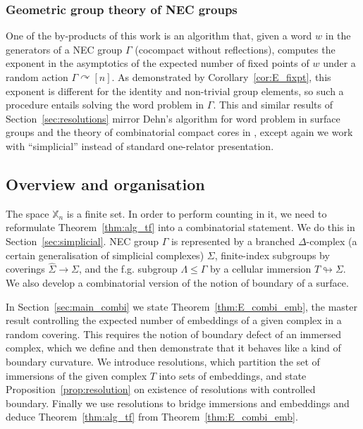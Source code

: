 \documentclass{amsart}
\newcommand{\covers}{\mathbb{X}_n}
\newcommand{\whS}{{\widehat{\Sigma}}}
\begin{document}
\subsubsection{Geometric group theory of NEC groups}

One of the by-products of this work is an algorithm that, given a word $w$ in the generators of a NEC group $\Gamma$ (cocompact without reflections), computes the exponent in the asymptotics of the expected number of fixed points of $w$ under a random action $\Gamma\curvearrowright[n]$. As demonstrated by Corollary~\ref{cor:E_fixpt}, this exponent is different for the identity and non-trivial group elements, so such a procedure entails solving the word problem in $\Gamma$. This and similar results of Section~\ref{sec:resolutions} mirror Dehn's algorithm for word problem in surface groups \cite{transformationen_kurven_zweiseitigen_flachen_Dehn12} and the theory of combinatorial compact cores in \cite{core_surfaces_MageePuder22}, except again we work with ``simplicial'' instead of standard one-relator presentation.

\subsection{Overview and organisation}

The space $\covers$ is a finite set. In order to perform counting in it, we need to reformulate Theorem~\ref{thm:alg_tf} into a combinatorial statement. We do this in Section~\ref{sec:simplicial}. NEC group $\Gamma$ is represented by a branched $\Delta$-complex (a certain generalisation of simplicial complexes) $\Sigma$, finite-index subgroups by coverings $\whS\to\Sigma$, and the f.g. subgroup $\Lambda\leq\Gamma$ by a cellular immersion $T\looparrowright\Sigma$. We also develop a combinatorial version of the notion of boundary of a surface.

In Section~\ref{sec:main_combi} we state Theorem~\ref{thm:E_combi_emb}, the master result controlling the expected number of embeddings of a given complex in a random covering. This requires the notion of boundary defect of an immersed complex, which we define and then demonstrate that it behaves like a kind of boundary curvature. We introduce resolutions, which partition the set of immersions of the given complex $T$ into sets of embeddings, and state Proposition~\ref{prop:resolution} on existence of resolutions with controlled boundary. Finally we use resolutions to bridge immersions and embeddings and deduce Theorem~\ref{thm:alg_tf} from Theorem~\ref{thm:E_combi_emb}.
\end{document}
